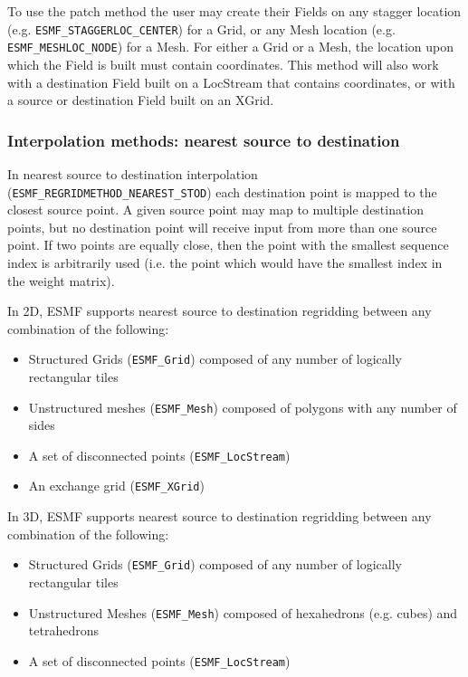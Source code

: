  To use the patch method the user may create their Fields on any stagger location (e.g. {\tt ESMF\_STAGGERLOC\_CENTER}) for a Grid, or
 any Mesh location (e.g. {\tt ESMF\_MESHLOC\_NODE}) for a Mesh. For either a Grid or a Mesh, the location upon which the Field is built 
 must contain coordinates. This method will also work with a destination Field built on a LocStream that contains coordinates, 
 or with a source or destination Field built on an XGrid.

\subsubsection{Interpolation methods: nearest source to destination}\label{sec:interpolation:neareststod}
In nearest source to destination interpolation ({\tt ESMF\_REGRIDMETHOD\_NEAREST\_STOD}) each destination point is mapped to the closest source point. A given source point may map to multiple destination points, but no destination point will receive input from more than one source point. If two points are equally close, then the point with the smallest sequence index is arbitrarily used (i.e. the point which would have the smallest index in the weight matrix). 

\smallskip

 In 2D, ESMF supports nearest source to destination regridding between any combination of the following:
 \begin{itemize}
 \item Structured Grids ({\tt ESMF\_Grid}) composed of any number of logically rectangular tiles
 \item Unstructured meshes ({\tt ESMF\_Mesh}) composed of polygons with any number of sides
 \item A set of disconnected points ({\tt ESMF\_LocStream}) 
 \item An exchange grid ({\tt ESMF\_XGrid})
 \end{itemize}

\smallskip

 In 3D, ESMF supports nearest source to destination regridding between any combination of the following:
 \begin{itemize}
 \item Structured Grids ({\tt ESMF\_Grid}) composed of any number of logically rectangular tiles
 \item Unstructured Meshes ({\tt ESMF\_Mesh}) composed of hexahedrons (e.g. cubes) and tetrahedrons
 \item A set of disconnected points ({\tt ESMF\_LocStream}) 
 \end{itemize}


